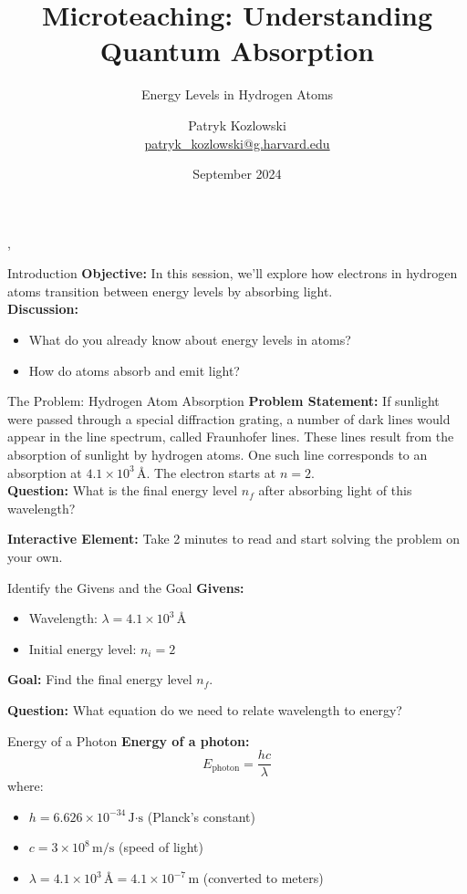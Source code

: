 \documentclass{beamer}
\title{Microteaching: Understanding Quantum Absorption}
\subtitle{Energy Levels in Hydrogen Atoms}
\author{Patryk Kozlowski \\ \href{mailto:patryk\_kozlowski@g.harvard.edu}{patryk\_kozlowski@g.harvard.edu}}
\date{September 2024}
\begin{document}
,

\frame{\titlepage}

\begin{frame}{Introduction}
    \textbf{Objective:} 
    In this session, we'll explore how electrons in hydrogen atoms transition between energy levels by absorbing light. \\
    \pause
    \textbf{Discussion:} 
    \begin{itemize}
        \item What do you already know about energy levels in atoms? \pause
        \item How do atoms absorb and emit light? \pause
    \end{itemize}
\end{frame}

\begin{frame}{The Problem: Hydrogen Atom Absorption}
    \textbf{Problem Statement:} \pause
    If sunlight were passed through a special diffraction grating, a number of dark lines would appear in the line spectrum, called Fraunhofer lines. These lines result from the absorption of sunlight by hydrogen atoms. One such line corresponds to an absorption at \(4.1 \times 10^3 \, \text{\AA}\). The electron starts at \(n = 2\).\\
    \pause
    \textbf{Question:} 
    What is the final energy level \(n_f\) after absorbing light of this wavelength? \pause
    
    \textbf{Interactive Element:} Take 2 minutes to read and start solving the problem on your own. \pause
\end{frame}

\begin{frame}{Identify the Givens and the Goal}
    \textbf{Givens:} \pause
    \begin{itemize}
        \item Wavelength: \( \lambda = 4.1 \times 10^3 \, \text{\AA} \) \pause
        \item Initial energy level: \(n_i = 2\) \pause
    \end{itemize}
    \textbf{Goal:} Find the final energy level \(n_f\). \pause
    
    \textbf{Question:} What equation do we need to relate wavelength to energy? \pause
\end{frame}

\begin{frame}{Energy of a Photon}
    \textbf{Energy of a photon:} \pause
    \[
    E_{\text{photon}} = \frac{hc}{\lambda}
    \] \pause
    where:
    \begin{itemize}
        \item \( h = 6.626 \times 10^{-34} \, \text{J·s} \) (Planck’s constant) \pause
        \item \( c = 3 \times 10^8 \, \text{m/s} \) (speed of light) \pause
        \item \( \lambda = 4.1 \times 10^3 \, \text{\AA} = 4.1 \times 10^{-7} \, \text{m} \) (converted to meters) \pause
    \end{itemize}
\end{frame}
\end{document}
